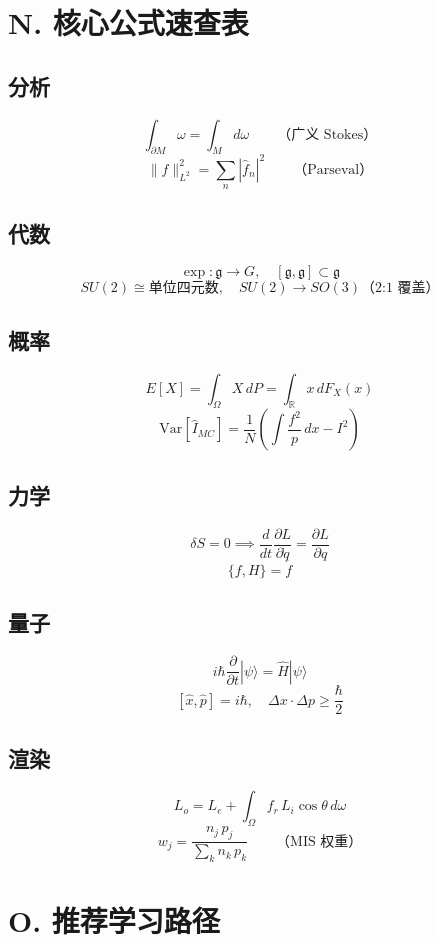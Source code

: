 \section{N. 核心公式速查表}

\subsection{分析}
\[
\int_{\partial M} \omega = \int_M d\omega \qquad \text{（广义 Stokes）}
\]
\[
\|f\|_{L^2}^2 = \sum_n |\hat{f}_n|^2 \qquad \text{（Parseval）}
\]

\subsection{代数}
\[
\exp: \mathfrak{g} \to G, \quad [\mathfrak{g}, \mathfrak{g}] \subset \mathfrak{g}
\]
\[
SU(2) \cong \text{单位四元数}, \quad SU(2) \to SO(3) \text{（2:1 覆盖）}
\]

\subsection{概率}
\[
E[X] = \int_\Omega X\,dP = \int_{\mathbb{R}} x\,dF_X(x)
\]
\[
\text{Var}[\hat{I}_{MC}] = \frac{1}{N}\left(\int \frac{f^2}{p}\,dx - I^2\right)
\]

\subsection{力学}
\[
\delta S = 0 \implies \frac{d}{dt}\frac{\partial L}{\partial \dot{q}} = \frac{\partial L}{\partial q}
\]
\[
\{f, H\} = \dot{f}
\]

\subsection{量子}
\[
i\hbar\frac{\partial}{\partial t}|\psi\rangle = \hat{H}|\psi\rangle
\]
\[
[\hat{x}, \hat{p}] = i\hbar, \quad \Delta x \cdot \Delta p \geq \frac{\hbar}{2}
\]

\subsection{渲染}
\[
L_o = L_e + \int_\Omega f_r\, L_i \cos\theta\, d\omega
\]
\[
w_j = \frac{n_j\, p_j}{\sum_k n_k\, p_k} \qquad \text{（MIS 权重）}
\]

\section{O. 推荐学习路径}

